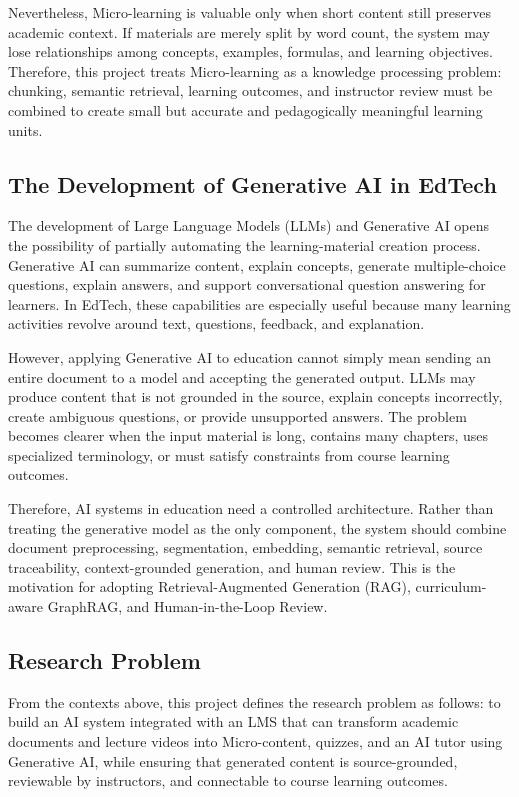 Nevertheless, Micro-learning is valuable only when short content still
preserves academic context. If materials are merely split by word count, the
system may lose relationships among concepts, examples, formulas, and learning
objectives. Therefore, this project treats Micro-learning as a knowledge
processing problem: chunking, semantic retrieval, learning outcomes, and
instructor review must be combined to create small but accurate and
pedagogically meaningful learning units.

\subsection{The Development of Generative AI in EdTech}

The development of Large Language Models (LLMs) and Generative AI opens the
possibility of partially automating the learning-material creation process.
Generative AI can summarize content, explain concepts, generate multiple-choice
questions, explain answers, and support conversational question answering for
learners. In EdTech, these capabilities are especially useful because many
learning activities revolve around text, questions, feedback, and explanation.

However, applying Generative AI to education cannot simply mean sending an
entire document to a model and accepting the generated output. LLMs may produce
content that is not grounded in the source, explain concepts incorrectly,
create ambiguous questions, or provide unsupported answers. The problem becomes
clearer when the input material is long, contains many chapters, uses
specialized terminology, or must satisfy constraints from course learning
outcomes.

Therefore, AI systems in education need a controlled architecture. Rather than
treating the generative model as the only component, the system should combine
document preprocessing, segmentation, embedding, semantic retrieval, source
traceability, context-grounded generation, and human review. This is the
motivation for adopting Retrieval-Augmented Generation (RAG), curriculum-aware
GraphRAG, and Human-in-the-Loop Review.

\subsection{Research Problem}

From the contexts above, this project defines the research problem as follows:
to build an AI system integrated with an LMS that can transform academic
documents and lecture videos into Micro-content, quizzes, and an AI tutor using
Generative AI, while ensuring that generated content is source-grounded,
reviewable by instructors, and connectable to course learning outcomes.

